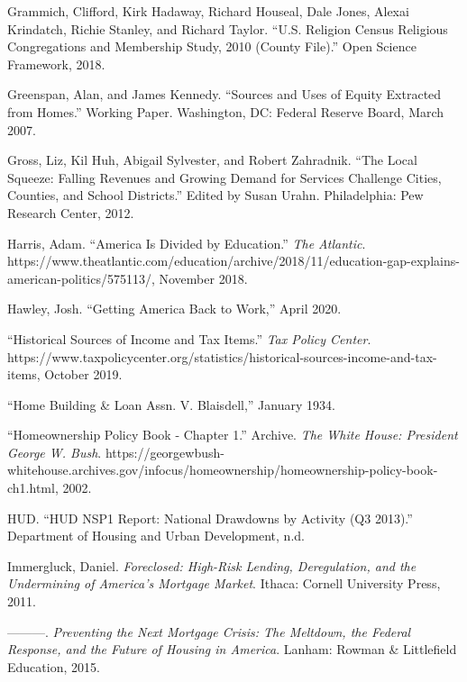 \documentclass[12pt,oneside]{psthesis}
\begin{document}
\leavevmode\hypertarget{ref-grammich2018religion}{}%
Grammich, Clifford, Kirk Hadaway, Richard Houseal, Dale Jones, Alexai Krindatch, Richie Stanley, and Richard Taylor. ``U.S. Religion Census Religious Congregations and Membership Study, 2010 (County File).'' Open Science Framework, 2018.

\leavevmode\hypertarget{ref-greenspan2007sources}{}%
Greenspan, Alan, and James Kennedy. ``Sources and Uses of Equity Extracted from Homes.'' Working Paper. Washington, DC: Federal Reserve Board, March 2007.

\leavevmode\hypertarget{ref-gross2012local}{}%
Gross, Liz, Kil Huh, Abigail Sylvester, and Robert Zahradnik. ``The Local Squeeze: Falling Revenues and Growing Demand for Services Challenge Cities, Counties, and School Districts.'' Edited by Susan Urahn. Philadelphia: Pew Research Center, 2012.

\leavevmode\hypertarget{ref-harris2018america}{}%
Harris, Adam. ``America Is Divided by Education.'' \emph{The Atlantic}. https://www.theatlantic.com/education/archive/2018/11/education-gap-explains-american-politics/575113/, November 2018.

\leavevmode\hypertarget{ref-hawley2020getting}{}%
Hawley, Josh. ``Getting America Back to Work,'' April 2020.

\leavevmode\hypertarget{ref-2019historical}{}%
``Historical Sources of Income and Tax Items.'' \emph{Tax Policy Center}. https://www.taxpolicycenter.org/statistics/historical-sources-income-and-tax-items, October 2019.

\leavevmode\hypertarget{ref-1934home}{}%
``Home Building \& Loan Assn. V. Blaisdell,'' January 1934.

\leavevmode\hypertarget{ref-2002homeownership}{}%
``Homeownership Policy Book - Chapter 1.'' Archive. \emph{The White House: President George W. Bush}. https://georgewbush-whitehouse.archives.gov/infocus/homeownership/homeownership-policy-book-ch1.html, 2002.

\leavevmode\hypertarget{ref-hud2013hud}{}%
HUD. ``HUD NSP1 Report: National Drawdowns by Activity (Q3 2013).'' Department of Housing and Urban Development, n.d.

\leavevmode\hypertarget{ref-immergluck2011foreclosed}{}%
Immergluck, Daniel. \emph{Foreclosed: High-Risk Lending, Deregulation, and the Undermining of America's Mortgage Market}. Ithaca: Cornell University Press, 2011.

\leavevmode\hypertarget{ref-immergluckPreventingNextMortgage2015}{}%
---------. \emph{Preventing the Next Mortgage Crisis: The Meltdown, the Federal Response, and the Future of Housing in America}. Lanham: Rowman \& Littlefield Education, 2015.
\end{document}
